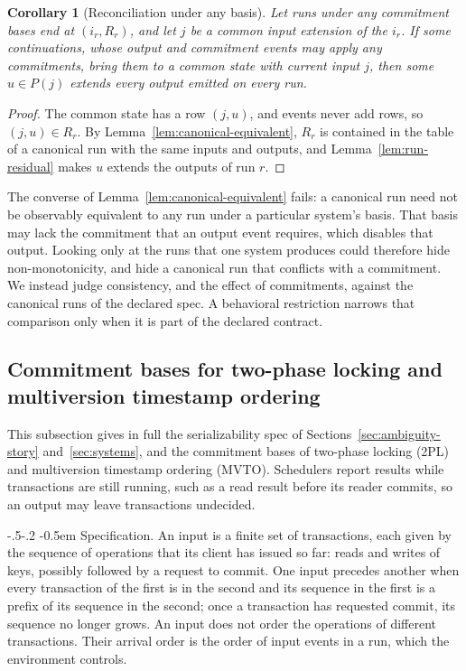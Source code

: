\documentclass[sigconf]{cidr-2027}
\makeatletter
\newtheorem{corollary}{Corollary}
\theoremstyle{remark}
\renewcommand\paragraph{\@startsection{paragraph}{4}{\z@}%
  {-.5\baselineskip \@plus -2\p@ \@minus -.2\p@}%
  {-0.5em}%
  {\normalfont\bfseries}}
\newcommand{\commitment}{commitment\xspace}
\newcommand{\commitments}{commitments\xspace}
\newcommand{\Commitment}{Commitment\xspace}
\newcommand{\indesc}{input extension\xspace} %
\newcommand{\outrel}{extends\xspace}          %
\newcommand{\fiber}[1]{P(#1)}
\makeatother
\begin{document}
\begin{corollary}[Reconciliation under any basis]
\label{cor:reconciliation-any-basis}
Let runs under any \commitment bases end at $(i_r,R_r)$, and let $j$ be a
common \indesc of the $i_r$. If some continuations, whose output and \commitment events
may apply any \commitments, bring them to a common state with current input $j$,
then some $u\in\fiber{j}$ \outrel every output emitted on every run.
\end{corollary}

\begin{proof}
The common state has a row $(j,u)$, and events never add rows, so
$(j,u)\in R_r$. By Lemma~\ref{lem:canonical-equivalent}, $R_r$ is contained in
the table of a canonical run with the same inputs and outputs, and
Lemma~\ref{lem:run-residual} makes $u$ \outrel the outputs of run $r$.
\end{proof}

The converse of Lemma~\ref{lem:canonical-equivalent} fails: a canonical run
need not be observably equivalent to any run under a particular system's
basis. That basis may lack the \commitment that an output event requires,
which disables that output. Looking only at the runs that one system produces
could therefore hide non-monotonicity, and hide a canonical run that conflicts
with a \commitment. We instead judge consistency, and the effect of
\commitments, against the canonical runs of the declared spec. A behavioral
restriction narrows that comparison only when it is part of the declared
contract.

\subsection{\Commitment bases for two-phase locking and multiversion timestamp ordering}
\label{app:cc-bases}

This subsection gives in full the serializability spec of
Sections~\ref{sec:ambiguity-story} and~\ref{sec:systems}, and the \commitment
bases of two-phase locking (2PL) and multiversion timestamp ordering (MVTO). Schedulers report results while transactions are still running, such as a
read result before its reader commits, so an output may leave transactions
undecided.

\paragraph{Specification.}
An input is a finite set of transactions, each given by the sequence of
operations that its client has issued so far: reads and writes of keys,
possibly followed by a request to commit. One input precedes another when
every transaction of the first is in the second and its sequence in the first
is a prefix of its sequence in the second; once a transaction has requested
commit, its sequence no longer grows. An input does not order the operations
of different transactions. Their arrival order is the order of input events
in a run, which the environment controls.
\end{document}

